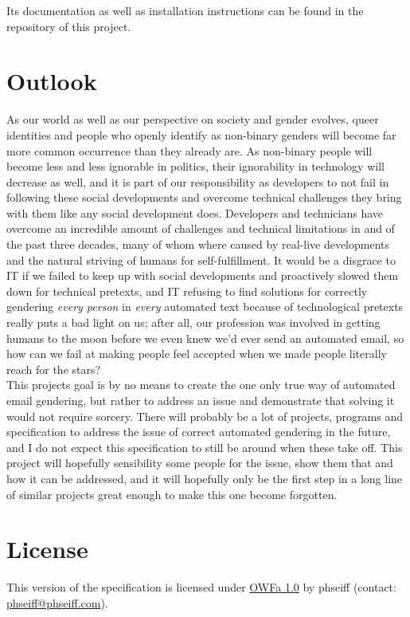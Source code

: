 \documentclass{article}
\begin{document}
    Its documentation as well as installation instructions can be found in the repository of this project.\\

\section{Outlook}

    As our world as well as our perspective on society and gender evolves, queer identities and people who openly identify as non-binary genders will become far more common occurrence than they already are.
    As non-binary people will become less and less ignorable in politics, their ignorability in technology will decrease as well, and it is part of our responsibility as developers to not fail in following these social developments and overcome technical challenges they bring with them like any social development does.
    Developers and technicians have overcome an incredible amount of challenges and technical limitations in and of the past three decades, many of whom where caused by real-live developments and the natural striving of humans for self-fulfillment.
    It would be a disgrace to IT if we failed to keep up with social developments and proactively slowed them down for technical pretexts, and IT refusing to find solutions for correctly gendering \emph{every person} in \emph{every} automated text because of technological pretexts really puts a bad light on us;
    after all, our profession was involved in getting humans to the moon before we even knew we'd ever send an automated email, so how can we fail at making people feel accepted when we made people literally reach for the stars? \\

    This projects goal is by no means to create the one only true way of automated email gendering, but rather to address an issue and demonstrate that solving it would not require sorcery.
    There will probably be a lot of projects, programs and specification to address the issue of correct automated gendering in the future, and I do not expect this specification to still be around when these take off.
    This project will hopefully sensibility some people for the issue, show them that and how it can be addressed, and it will hopefully only be the first step in a long line of similar projects great enough to make this one become forgotten.\\

\section{License}

    This version of the specification is licensed under \href{http://www.openwebfoundation.org/legal/the-owf-1-0-agreements/owfa-1-0}{OWFa 1.0} by phseiff (contact: \href{mailto:phseiff@phseiff.com}{phseiff@phseiff.com}).
\end{document}
